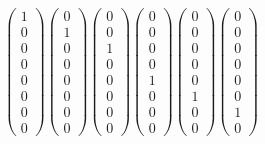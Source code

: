 \begin{equation}
 \begin{pmatrix}
  1 \\ 0 \\ 0 \\ 0 \\ 0 \\ 0 \\ 0 \\ 0
 \end{pmatrix}
 \begin{pmatrix}
  0 \\ 1 \\ 0 \\ 0 \\ 0 \\ 0 \\ 0 \\ 0
 \end{pmatrix}
 \begin{pmatrix}
  0 \\ 0 \\ 1 \\ 0 \\ 0 \\ 0 \\ 0 \\ 0
 \end{pmatrix}
 \begin{pmatrix}
  0 \\ 0 \\ 0 \\ 0 \\ 1 \\ 0 \\ 0 \\ 0
 \end{pmatrix}
 \begin{pmatrix}
  0 \\ 0 \\ 0 \\ 0 \\ 0 \\ 1 \\ 0 \\ 0
 \end{pmatrix}
 \begin{pmatrix}
  0 \\ 0 \\ 0 \\ 0 \\ 0 \\ 0 \\ 1 \\ 0
 \end{pmatrix}
\end{equation}
